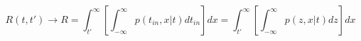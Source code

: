 \begin{equation}
R(t,t') \to R= \int_{t'}^\infty \left[ \int_{-\infty}^\infty p(t_{in},x|t) dt_{in} \right]  dx = \int_{t'}^\infty \left[ \int_{-\infty}^\infty p(z,x|t) dz \right] dx
\end{equation}